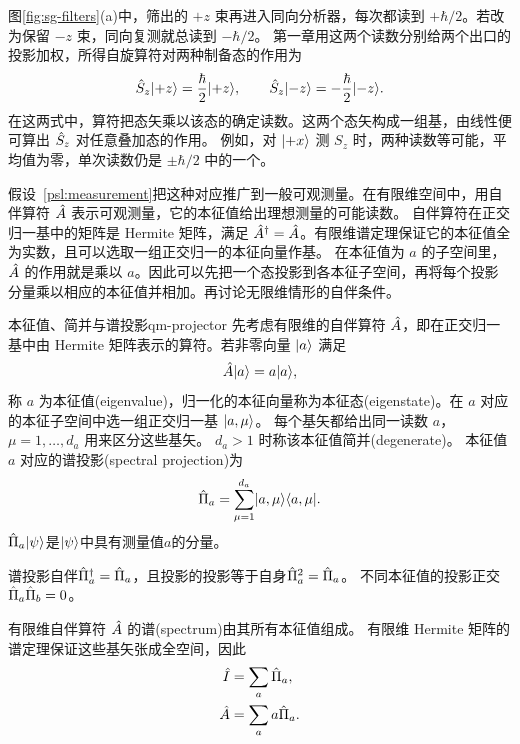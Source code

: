 图\ref{fig:sg-filters}(a)中，筛出的 $+z$ 束再进入同向分析器，每次都读到 $+\hbar/2$。若改为保留 $-z$ 束，同向复测就总读到 $-\hbar/2$。
第一章用这两个读数分别给两个出口的投影加权，所得自旋算符对两种制备态的作用为
\[
    \hat{S}_z\lvert+z\rangle = \frac{\hbar}{2}\lvert+z\rangle,\qquad
    \hat{S}_z\lvert-z\rangle = -\frac{\hbar}{2}\lvert-z\rangle.
\]
在这两式中，算符把态矢乘以该态的确定读数。这两个态矢构成一组基，由线性便可算出 $\hat{S}_z$ 对任意叠加态的作用。
例如，对 $\lvert+x\rangle$ 测 $S_z$ 时，两种读数等可能，平均值为零，单次读数仍是 $\pm\hbar/2$ 中的一个。

假设~\ref{psl:measurement}把这种对应推广到一般可观测量。在有限维空间中，用自伴算符 $\hat{A}$ 表示可观测量，它的本征值给出理想测量的可能读数。
自伴算符在正交归一基中的矩阵是 Hermite 矩阵，满足 $\hat{A}^\dagger = \hat{A}$。有限维谱定理保证它的本征值全为实数，且可以选取一组正交归一的本征向量作基。
在本征值为 $a$ 的子空间里，$\hat{A}$ 的作用就是乘以 $a$。因此可以先把一个态投影到各本征子空间，再将每个投影分量乘以相应的本征值并相加。再讨论无限维情形的自伴条件。

\begin{definition}{本征值、简并与谱投影}{qm-projector}
    先考虑有限维的自伴算符 $\hat{A}$，即在正交归一基中由 Hermite 矩阵表示的算符。若非零向量 $\lvert a\rangle$ 满足
    \begin{equation}
        \hat{A}\lvert a\rangle = a\lvert a\rangle,
    \end{equation}
    称 $a$ 为本征值(eigenvalue)，归一化的本征向量称为本征态(eigenstate)。在 $a$ 对应的本征子空间中选一组正交归一基 $\lvert a,\mu\rangle$。
    每个基矢都给出同一读数 $a$，$\mu = 1,\ldots,d_a$ 用来区分这些基矢。
    $d_a > 1$ 时称该本征值简并(degenerate)。
    本征值 $a$ 对应的谱投影(spectral projection)为
    \begin{equation}
        \hat{\Pi}_a = \sum_{\mu=1}^{d_a}\lvert a,\mu\rangle\langle a,\mu\rvert.
    \end{equation}
    $\hat{\Pi}_a\lvert\psi\rangle$是$\lvert\psi\rangle$中具有测量值$a$的分量。
\end{definition}

\begin{corollary}
    谱投影自伴$\hat{\Pi}_a^\dagger = \hat{\Pi}_a$，且投影的投影等于自身$\hat{\Pi}_a^2 = \hat{\Pi}_a$。
    不同本征值的投影正交$\hat{\Pi}_a\hat{\Pi}_b = 0$。
\end{corollary}

\begin{corollary}[有限维自伴算符的谱分解]
    有限维自伴算符 $\hat{A}$ 的谱(spectrum)由其所有本征值组成。
    有限维 Hermite 矩阵的谱定理保证这些基矢张成全空间，因此
    \begin{subequations}
        \begin{align}
            \hat{I} &= \sum_a \hat{\Pi}_a,\\
            \hat{A} &= \sum_a a\hat{\Pi}_a.
        \end{align}
    \end{subequations}
\end{corollary}

